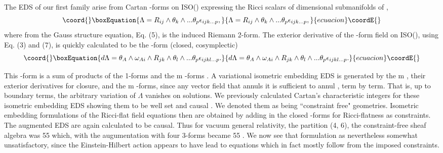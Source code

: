 \documentclass[a4paper,a4paper]{article}
\begin{document}
        The  EDS of our first family arise from Cartan \coordHE{}-forms on
ISO(\coordHE{}) expressing the Ricci scalars of \coordHE{} dimensional
submanifolds of \coordHE{},
\begin{equation}\coord{}\boxEquation{
\Lambda  = {R_{{ij}}}\wedge {{\theta }_k}\wedge ...{{\theta }_p}
{{\epsilon }_{{ijk}...p}},
}{
\Lambda  = {R_{{ij}}}\wedge {{\theta }_k}\wedge ...{{\theta }_p}
{{\epsilon }_{{ijk}...p}},
}{ecuacion}\coordE{}\end{equation}
where from the Gauss structure equation,  Eq. (5),  \coordHE{}
is the induced Riemann 2-form.   The exterior derivative of the \coordHE{}-form
field \myHighlight{$\Lambda $}\coordHE{} on ISO(\coordHE{}),  using Eq. (3) and (7),  is quickly
calculated to be the \coordHE{}-form (closed,  cosymplectic)
\begin{equation}\coord{}\boxEquation{
{d\Lambda } = {{\theta }_A}\wedge {{\omega }_{{Ai}}}\wedge
{R_{{jk}}}\wedge {{\theta
}_l}\wedge ...{{\theta }_p} {{\epsilon }_{{ijkl}...p}}.
}{
{d\Lambda } = {{\theta }_A}\wedge {{\omega }_{{Ai}}}\wedge
{R_{{jk}}}\wedge {{\theta
}_l}\wedge ...{{\theta }_p} {{\epsilon }_{{ijkl}...p}}.
}{ecuacion}\coordE{}\end{equation}

This \coordHE{}-form is a sum of products of the \coordHE{} 1-forms \coordHE{} and the m \coordHE{}-forms \coordHE{}.  A variational isometric embedding EDS is generated
by  the m  \coordHE{},  their exterior derivatives for closure,  and the m
\coordHE{}-forms,  since any vector field that annuls it is sufficient to annul
\coordHE{},  term by term.  That is,  up to boundary terms,  the arbitrary
variation of \(\Lambda \) vanishes on solutions.  We previously
calculated  Cartan's characteristic integers for these isometric embedding EDS  showing them
to be well set and causal \cite{est99}.  We denoted them as being
``constraint free" geometries.  Isometric embedding  formulations of the Ricci-flat field
equations then are obtained by adding in the closed \coordHE{}-forms for
Ricci-flatness as constraints. The augmented  EDS are again calculated to be causal.
Thus for vacuum general relativity,  the partition (4, 6),  the
constraint-free sheaf algebra was 55 \coordHE{} which,  with the
augumentation with four 3-forms became 55 \coordHE{}.  We now see that formulation as nevertheless somewhat unsatisfactory,  since
the Einstein-Hilbert action appears to have lead to equations which in
fact mostly follow from the imposed constraints.
\end{document}
